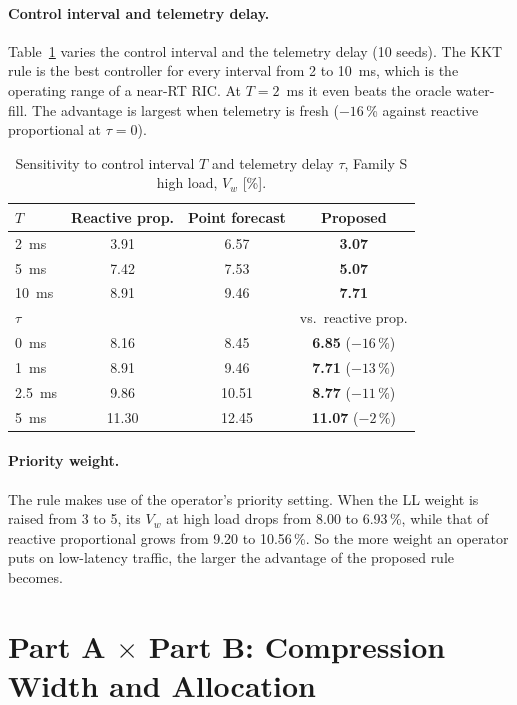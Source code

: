\paragraph{Control interval and telemetry delay.} Table~\ref{tab:b-interval} varies the control interval and the telemetry delay (10 seeds). The KKT rule is the best controller for every interval from 2 to 10~ms, which is the operating range of a near-RT RIC. At $T = 2$~ms it even beats the oracle water-fill. The advantage is largest when telemetry is fresh ($-16$\,\% against reactive proportional at $\tau = 0$).

\begin{table}[H]
\caption{Sensitivity to control interval $T$ and telemetry delay $\tau$, Family S high load, $V_w$ [\%].}
\label{tab:b-interval}
\centering\small
\begin{tabular}{lccc}
\toprule
$T$ & Reactive prop. & Point forecast & \textbf{Proposed} \\
\midrule
2~ms & 3.91 & 6.57 & \textbf{3.07} \\
5~ms & 7.42 & 7.53 & \textbf{5.07} \\
10~ms & 8.91 & 9.46 & \textbf{7.71} \\
\midrule
$\tau$ & & & vs.\ reactive prop. \\
\midrule
0~ms & 8.16 & 8.45 & \textbf{6.85} ($-16$\,\%) \\
1~ms & 8.91 & 9.46 & \textbf{7.71} ($-13$\,\%) \\
2.5~ms & 9.86 & 10.51 & \textbf{8.77} ($-11$\,\%) \\
5~ms & 11.30 & 12.45 & \textbf{11.07} ($-2$\,\%) \\
\bottomrule
\end{tabular}
\end{table}

\paragraph{Priority weight.} The rule makes use of the operator's priority setting. When the LL weight is raised from 3 to 5, its $V_w$ at high load drops from 8.00 to 6.93\,\%, while that of reactive proportional grows from 9.20 to 10.56\,\%. So the more weight an operator puts on low-latency traffic, the larger the advantage of the proposed rule becomes.

\section{Part A $\times$ Part B: Compression Width and Allocation}
\label{sec:rb-ab}

